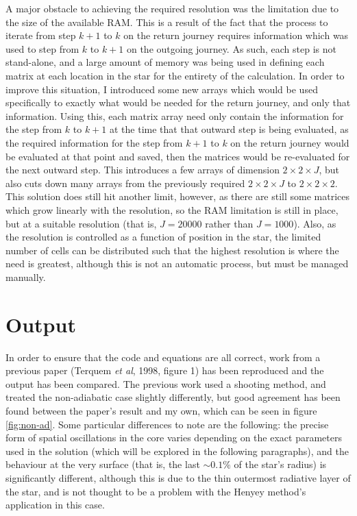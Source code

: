 \documentclass[11pt]{amsart}
\begin{document}
A major obstacle to achieving the required resolution was the limitation due to the size of the available RAM.  This is a result of the fact that the process to iterate from step $k+1$ to $k$ on the return journey requires information which was used to step from $k$ to $k+1$ on the outgoing journey.  As such, each step is not stand-alone, and a large amount of memory was being used in defining each matrix at each location in the star for the entirety of the calculation.  In order to improve this situation, I introduced some new arrays which would be used specifically to exactly what would be needed for the return journey, and only that information.  Using this, each matrix array need only contain the information for the step from $k$ to $k+1$ at the time that that outward step is being evaluated, as the required information for the step from $k+1$ to $k$ on the return journey would be evaluated at that point and saved, then the matrices would be re-evaluated for the next outward step.  This introduces a few arrays of dimension $2 \times 2 \times J$, but also cuts down many arrays from the previously required $2 \times 2 \times J$ to $2 \times 2 \times 2$.  This solution does still hit another limit, however, as there are still some matrices which grow linearly with the resolution, so the RAM limitation is still in place, but at a suitable resolution (that is, $J = 20000$ rather than $J = 1000$).  Also, as the resolution is controlled as a function of position in the star, the limited number of cells can be distributed such that the highest resolution is where the need is greatest, although this is not an automatic process, but must be managed manually.







\section{Output} \label{Output}

In order to ensure that the code and equations are all correct, work from a previous paper (Terquem \textit{et al}, 1998, figure 1) has been reproduced and the output has been compared.  The previous work used a shooting method, and treated the non-adiabatic case slightly differently, but good agreement has been found between the paper's result and my own, which can be seen in figure \ref{fig:non-ad}.  Some particular differences to note are the following: the precise form of spatial oscillations in the core varies depending on the exact parameters used in the solution (which will be explored in the following paragraphs), and the behaviour at the very surface (that is, the last $\sim 0.1 \%$ of the star's radius) is significantly different, although this is due to the thin outermost radiative layer of the star, and is not thought to be a problem with the Henyey method's application in this case.
\end{document}
